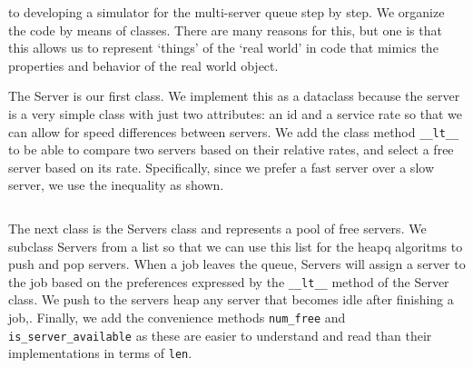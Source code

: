 \documentclass[stochastic-or.tex]{subfiles}
\begin{document}






 to developing a simulator for the multi-server queue step by step. We organize the code by means of classes. There are many reasons for this, but one is that this allows us to represent `things' of the `real world' in code that mimics the properties and behavior of the real world object.

The Server is our first class.
We implement this as a dataclass because the server is a very simple class with just two attributes: an id and a service rate so that we can allow for speed differences between servers.
We add the class method \texttt{__lt__} to be able to compare two servers based on their relative rates, and select a free server based on its rate.
Specifically, since we prefer a fast server over a slow server, we  use the inequality as shown.
\inputminted[label=server.py]{python}{../code/event_stacks/server.py}


The next class is the Servers class and represents a pool of free servers.
We subclass Servers from a list so that we can use this list for the heapq algoritms to push and pop servers.
When a job leaves the queue, Servers will assign a server to the job based on the preferences expressed by the \texttt{__lt__} method of the Server class.
We push to the servers heap any server that becomes idle after finishing a job,.
Finally, we add the convenience methods \texttt{num_free} and \texttt{is_server_available} as these are easier to understand and read than their implementations in terms of \texttt{len}.
\inputminted[label=servers.py]{python}{../code/event_stacks/servers.py}
\end{document}
